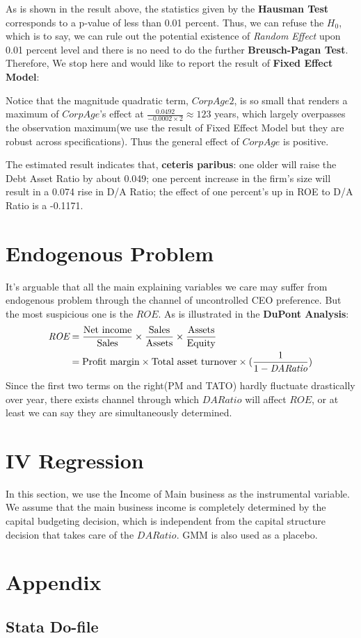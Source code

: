 \documentclass{article}
\begin{document}
	\begin{stlog}
	\nullskip
	\end{stlog}

As is shown in the result above, the statistics given by the {\bf Hausman Test} corresponds to a p-value of less than 0.01 percent. Thus, we can refuse the $H_0$, which is to say, we can rule out the potential existence of {\it Random Effect} upon 0.01 percent level and there is no need to do the further {\bf Breusch-Pagan Test}. 
Therefore, We stop here and would like to report the result of {\bf Fixed Effect Model}:

Notice that the magnitude quadratic term, $CorpAge2$, is so small that renders a maximum of $CorpAge$'s effect at $\frac{0.0492}{-0.0002\times2}\approx 123$ years, which largely overpasses the observation maximum(we use the result of Fixed Effect Model but they are robust across specifications). Thus the general effect of $CorpAge$ is positive.

The estimated result indicates that, {\bf ceteris paribus}: one older will raise the Debt Asset Ratio by about 0.049; one percent increase in the firm's size will result in a 0.074 rise in D/A Ratio; the effect of one percent's up in ROE to D/A Ratio is a -0.1171.

\newpage
\section{Endogenous Problem}\label{sec:endogenous}
It's arguable that all the main explaining variables we care may suffer from endogenous problem through the channel of uncontrolled CEO preference. But the most suspicious one is the $ROE$. As is illustrated in the {\bf DuPont Analysis}:
\begin{align}
	\notag
	\textit{ROE} &= \frac{\text{Net income}}{\text{Sales}}\times\frac{\text{Sales}}{\text{Assets}}\times\frac{\text{Assets}}{\text{Equity}}\\
	&= \text{Profit margin}\times\text{Total asset turnover}\times(\frac{1}{1-\textit{DARatio}})
\end{align}
Since the first two terms on the right(PM and TATO) hardly fluctuate drastically over year, there exists channel through which $DARatio$ will affect $ROE$, or at least we can say they are simultaneously determined.

\section{IV Regression}\label{sec:IV}
In this section, we use the Income of Main business as the instrumental variable. We assume that the main business income is completely determined by the capital budgeting decision, which is independent from the capital structure decision that takes care of the $DARatio$. GMM is also used as a placebo.


\newpage
\begin{appendix}\label{sec:appendix}
\section{Appendix}
\subsection{Stata Do-file}

\nocite{*}


\end{appendix}
\end{document}
